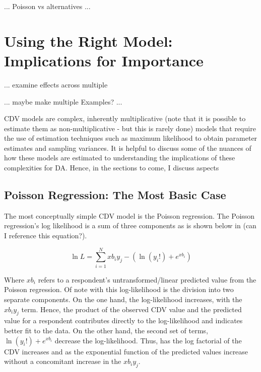 \documentclass[ShortAfour,times,sageapa]{sagej}
\begin{document}
	... Poisson vs alternatives ...
	
\section{Using the Right Model: Implications for Importance}

	... examine effects across multiple 
	
	... maybe make multiple Examples? ...
	
	
	CDV models are complex, inherently multiplicative (note that it is possible to estimate them as non-multiplicative - but this is rarely done) models that require the use of estimation techniques such as maximum likelihood to obtain parameter estimates and sampling variances.
	It is helpful to discuss some of the nuances of how these models are estimated to understanding the implications of these complexities for DA.
	Hence, in the sections to come, I discuss aspects 

	\subsection{Poisson Regression: The Most Basic Case}
	
	The most conceptually simple CDV model is the Poisson regression.  
	The Poisson regression's log likelihood is a sum of three components as is shown below in (can I reference this equation?).
	
	\begin{equation}
		\ln L = \sum_{i=1}^{N} xb_{i}y_{j} - (\ln (y_{i}!) + e^{xb_{i}})
	\end{equation}

	Where $xb_{i}$ refers to a respondent's untransformed/linear predicted value from the Poisson regression.  
	Of note with this log-likelihood is the division into two separate components.  
	On the one hand, the log-likelihood increases, with the $xb_{i}y_{j}$ term.  
	Hence, the product of the observed CDV value and the predicted value for a respondent contributes directly to the log-likelihood and indicates better fit to the data.
	On the other hand, the second set of terms, $\ln (y_{i}!) + e^{xb_{i}}$ decrease the log-likelihood.  
	Thus, has the log factorial of the CDV increases and as the exponential function of the predicted values increase without a concomitant increase in the $xb_{i}y_{j}$.
	
\end{document}
